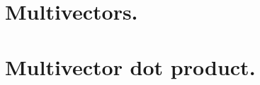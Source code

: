 \documentclass[ twoside,openright,titlepage,numbers=noenddot,headinclude,
                footinclude=true,cleardoublepage=empty,abstractoff,
                BCOR=5mm,
                paper=6in:9in,
                fontsize=11pt,
                floatperchapter,
                ngerman,american,
                ]{scrreprt}
\begin{document}
   \section{Multivectors.}
      
%      
%      
%      
%      
%      
%     
%      
%      
%      
   \section{Multivector dot product.}
      
%         
%         
\end{document}
